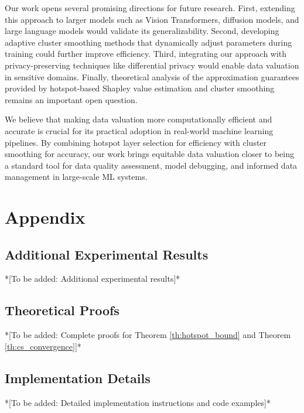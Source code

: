 \documentclass[12pt,a4paper]{report}
\begin{document}
\bigskip
Our work opens several promising directions for future research. First, extending this approach to larger models such as Vision Transformers, diffusion models, and large language models would validate its generalizability. Second, developing adaptive cluster smoothing methods that dynamically adjust parameters during training could further improve efficiency. Third, integrating our approach with privacy-preserving techniques like differential privacy would enable data valuation in sensitive domains. Finally, theoretical analysis of the approximation guarantees provided by hotspot-based Shapley value estimation and cluster smoothing remains an important open question.

\bigskip
We believe that making data valuation more computationally efficient and accurate is crucial for its practical adoption in real-world machine learning pipelines. By combining hotspot layer selection for efficiency with cluster smoothing for accuracy, our work brings equitable data valuation closer to being a standard tool for data quality assessment, model debugging, and informed data management in large-scale ML systems.

\clearpage
{}



\appendix
\chapter{Appendix}
\label{chap:appendix}

\section{Additional Experimental Results}
\label{sec:appendix_exp}

*[To be added: Additional experimental results]*

\section{Theoretical Proofs}
\label{sec:appendix_proofs}

*[To be added: Complete proofs for Theorem \ref{th:hotspot_bound} and Theorem \ref{th:cs_convergence}]*

\section{Implementation Details}
\label{sec:appendix_impl}

*[To be added: Detailed implementation instructions and code examples]*
\end{document}
